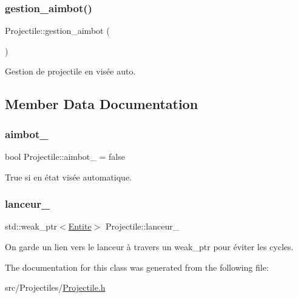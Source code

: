 \mbox{\label{class_projectile_a89eac25ede6c308ef4bd9b1e676f7c6b}} 
\subsubsection{\texorpdfstring{gestion\+\_\+aimbot()}{gestion\_aimbot()}}
{\footnotesize\ttfamily Projectile\+::gestion\+\_\+aimbot (\begin{DoxyParamCaption}{ }\end{DoxyParamCaption})}



Gestion de projectile en visée auto. 



\subsection{Member Data Documentation}
\mbox{\label{class_projectile_ae179f4250f0afb1f754e62176f27345c}} 
\subsubsection{\texorpdfstring{aimbot\+\_\+}{aimbot\_}}
{\footnotesize\ttfamily bool Projectile\+::aimbot\+\_\+ = false\hspace{0.3cm}{\ttfamily [protected]}}



True si en état visée automatique. 

\mbox{\label{class_projectile_adb4bd9a7bb88e528d517236e887a1639}} 
\subsubsection{\texorpdfstring{lanceur\+\_\+}{lanceur\_}}
{\footnotesize\ttfamily std\+::weak\+\_\+ptr$<$\mbox{\hyperlink{class_entite}{Entite}}$>$ Projectile\+::lanceur\+\_\+\hspace{0.3cm}{\ttfamily [protected]}}



On garde un lien vers le lanceur à travers un weak\+\_\+ptr pour éviter les cycles. 



The documentation for this class was generated from the following file\+:\begin{DoxyCompactItemize}
\item 
src/\+Projectiles/\mbox{\hyperlink{_projectile_8h}{Projectile.\+h}}\end{DoxyCompactItemize}
